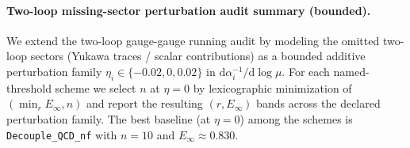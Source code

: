 \paragraph{Two-loop missing-sector perturbation audit summary (bounded).}
\AuditTag We extend the two-loop gauge-gauge running audit by modeling the omitted two-loop sectors (Yukawa traces / scalar contributions) as a bounded additive perturbation family $\eta_i\in\{-0.02,0,0.02\}$ in $\mathrm{d}\alpha_i^{-1}/\mathrm{d}\log\mu$. For each named-threshold scheme we select $n$ at $\eta=0$ by lexicographic minimization of $(\min_r E_\infty, n)$ and report the resulting $(r,E_\infty)$ bands across the declared perturbation family. The best baseline (at $\eta=0$) among the schemes is \texttt{Decouple\_QCD\_nf} with $n=10$ and $E_\infty\approx 0.830$.
